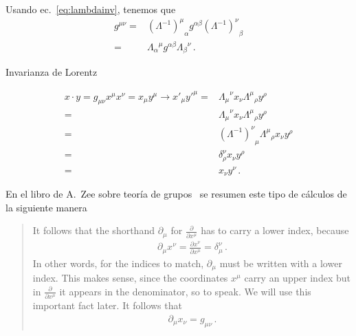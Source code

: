 \begin{frame}
Usando ec.~\eqref{eq:lambdainv}, tenemos que
\begin{align}
  \label{eq:Lambdacontra}
  g^{\mu\nu}=&{\left( \Lambda^{-1} \right)^{\mu}}_{\alpha}g^{\alpha\beta} {\left( \Lambda^{-1} \right)^{\nu}}_{\beta}\nonumber\\
=&{\Lambda_{\alpha}}^{\mu}g^{\alpha\beta}{\Lambda_{\beta}}^{\nu}\,.           
\end{align}


\end{frame}



\begin{frame}
\begin{example}
  


Invarianza de Lorentz

  \begin{align}
  x\cdot y= g_{\mu\nu}x^{\mu}x^{\nu}=  x_\mu y^\mu\to x'_\mu{y'}^\mu=&{\Lambda_\mu}^\nu x_\nu{\Lambda^\mu}_\rho y^\rho \nonumber\\
    =&{\Lambda_\mu}^\nu x_\nu{\Lambda^\mu}_\rho y^\rho \nonumber\\
    =&{\left(\Lambda^{-1}\right)^\nu}_\mu{\Lambda^\mu}_\rho x_\nu y^\rho \nonumber\\
    =&\delta^\nu_\rho x_\nu y^\rho \nonumber\\
    =&x_\nu y^\nu \nonumber\,.
  \end{align}

\end{example}

\end{frame}

En el libro de A.~Zee sobre teoría de grupos~\cite{Zee:2016fuk} se resumen este tipo de cálculos de la siguiente manera
\begin{quote}
  It follows that the shorthand $\partial_{\mu}$  for  $\frac{\partial}{\partial x^{\mu}}$  has to carry a lower index, because
  \begin{align}
  {\partial_{\mu} x^{\nu}=\frac{\partial x^{\nu}}{\partial x^{\mu}}=\delta_{\mu}^{\nu}}\,.  
  \end{align}
  In other words, for the indices to match, $\partial_{\mu}$  must be written with a lower index. This makes sense, since the coordinates $x^{\mu}$
  carry an upper index but in $\frac{\partial}{\partial x^{\mu}}$  it appears in the denominator, so to speak.
  We will use this important fact later. It follows that
  \begin{align}
  {\partial_{\mu} x_{\nu}=g_{\mu \nu}}\,.  
  \end{align}
\end{quote}



